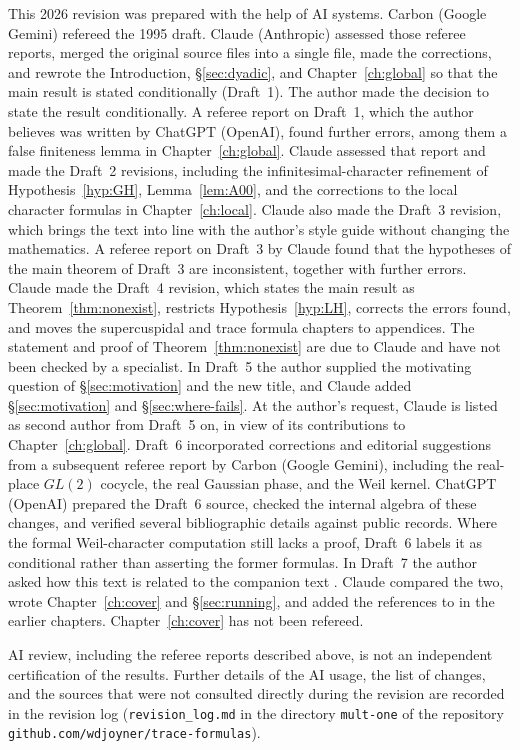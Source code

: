 \documentclass[12pt,letterpaper,openany]{book}
\theoremstyle{plain}
\theoremstyle{definition}
\theoremstyle{remark}
\theoremstyle{remark}
\begin{document}
This 2026 revision was prepared with the help of AI systems.
Carbon (Google Gemini) refereed the 1995 draft. Claude (Anthropic)
assessed those referee reports, merged the original source files into a
single file, made the corrections, and rewrote the Introduction,
\S\ref{sec:dyadic}, and Chapter~\ref{ch:global} so that the main result
is stated conditionally (Draft~1). The author made the decision to state
the result conditionally. A referee report on Draft~1, which the author
believes was written by ChatGPT (OpenAI), found further errors, among them
a false finiteness lemma in Chapter~\ref{ch:global}. Claude assessed that
report and made the Draft~2 revisions, including the
infinitesimal-character refinement of Hypothesis~\ref{hyp:GH},
Lemma~\ref{lem:A00}, and the corrections to the local character formulas
in Chapter~\ref{ch:local}. Claude also made the Draft~3 revision, which
brings the text into line with the author's style guide without changing
the mathematics. A referee report on Draft~3 by Claude found that the
hypotheses of the main theorem of Draft~3 are inconsistent, together with
further errors. Claude made the Draft~4 revision, which states the main
result as Theorem~\ref{thm:nonexist}, restricts Hypothesis~\ref{hyp:LH},
corrects the errors found, and moves the supercuspidal and trace formula
chapters to appendices. The statement and proof of
Theorem~\ref{thm:nonexist} are due to Claude and have not been checked by a
specialist. In Draft~5 the author supplied the motivating question of
\S\ref{sec:motivation} and the new title, and Claude added
\S\ref{sec:motivation} and \S\ref{sec:where-fails}. At the author's request,
Claude is listed as second author from Draft~5 on, in view of its
contributions to Chapter~\ref{ch:global}. Draft~6 incorporated
corrections and editorial suggestions from a subsequent referee
report by Carbon (Google Gemini), including the real-place
$GL(2)$ cocycle, the real Gaussian phase, and the Weil kernel.
ChatGPT (OpenAI) prepared the Draft~6 source, checked the
internal algebra of these changes, and verified several
bibliographic details against public records.
Where the formal Weil-character computation still lacks
a proof, Draft~6 labels it as conditional rather than
asserting the former formulas. In Draft~7 the author asked how this text
is related to the companion text \cite{JC}. Claude compared the two,
wrote Chapter~\ref{ch:cover} and \S\ref{sec:running}, and added the
references to \cite{JC} in the earlier chapters. Chapter~\ref{ch:cover}
has not been refereed.

AI review, including the referee reports described above, is not an
independent certification of the results. Further details of the AI usage,
the list of changes, and the sources that were not consulted directly
during the revision are recorded in the revision log
(\texttt{revision\_log.md} in the directory \texttt{mult-one} of the
repository \texttt{github.com/wdjoyner/trace-formulas}).
\end{document}
